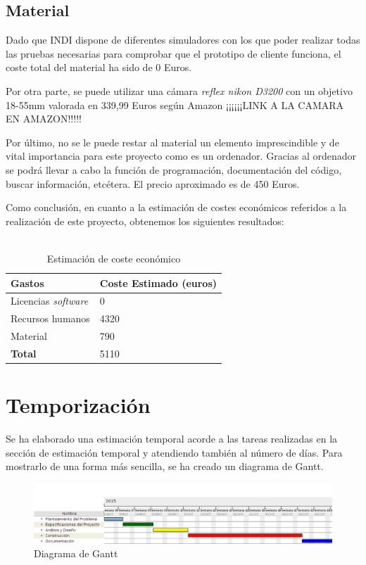 \subsection{Material}
Dado que INDI dispone de diferentes simuladores con los que poder realizar todas las pruebas necesarias para comprobar que el prototipo de cliente funciona, el coste total del material ha sido de 0 Euros.

Por otra parte, se puede utilizar una cámara \textit{reflex nikon D3200} con un objetivo 18-55mm valorada en 339,99 Euros según Amazon ¡¡¡¡¡¡LINK A LA CAMARA EN AMAZON!!!!!

Por último, no se le puede restar al material un elemento imprescindible y de vital importancia para este proyecto como es un ordenador. Gracias al ordenador se podrá llevar a cabo la función de programación, documentación del código, buscar información, etcétera. El precio aproximado es de 450 Euros.

Como conclusión, en cuanto a la estimación de costes económicos referidos a la realización de este proyecto, obtenemos los siguientes resultados:
\\ \\
\begin{table}[h]
\centering
\label{table:costeEstimado}
\begin{tabular}{ll}
\hline
{\bf Gastos}                   & {\bf Coste Estimado (euros)} \\ \hline
Licencias \textit{software}   & 0                             \\
Recursos humanos              & 4320                          \\
Material                      & 790                           \\
{\bf Total}                   & 5110                          \\ \hline
\end{tabular}
\caption{Estimación de coste económico}
\end{table}


\section{Temporización}
Se ha elaborado una estimación temporal acorde a las tareas realizadas en la sección de estimación temporal y atendiendo también al número de días. Para mostrarlo de una forma más sencilla, se ha creado un diagrama de Gantt.

\begin{figure}[htb]
\centering
\includegraphics[width=1\textwidth]{./imagenes/proyectoGantt}
\caption{Diagrama de Gantt} \label{fig:proyectoGantt}
\end{figure}
